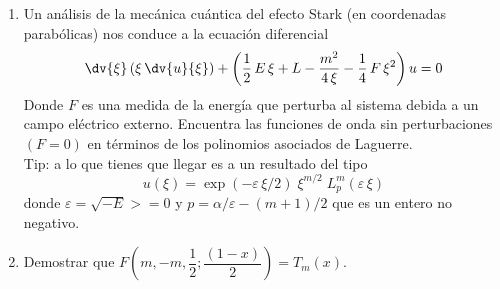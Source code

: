 \begin{enumerate}
\item Un análisis de la mecánica cuántica del efecto Stark (en coordenadas parabólicas) nos conduce a la ecuación diferencial
\[  \dv{\xi} \left( \xi \, \dv{u}{\xi} \right) + \left( \dfrac{1}{2} \, E \, \xi + L - \dfrac{m^{2}}{4 \, \xi} - \dfrac{1}{4} \, F \, \xi^{2} \right) u = 0 \]
Donde $F$ es una medida de la energía que perturba al sistema debida a un campo eléctrico externo. Encuentra las funciones de onda sin perturbaciones $(F=0)$ en términos de los polinomios asociados de Laguerre.
\\
Tip: a lo que tienes que llegar es a un resultado del tipo
\[ u(\xi) = \exp(- \varepsilon \, \xi /2) \; \xi^{m/2} \; L_{p}^{m} (\varepsilon \, \xi)  \]
donde $\varepsilon = \sqrt{-E} > = 0$ y $p = \alpha / \varepsilon - (m+1) / 2$ que es un entero no negativo.
\item Demostrar que $F \left(m, -m, \dfrac{1}{2}; \dfrac{(1-x)}{2} \right) = T_{m}(x)$.
\end{enumerate}
%
